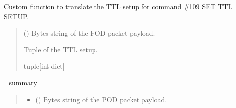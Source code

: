 \documentclass[letterpaper,10pt,english]{sphinxmanual}
\begin{document}
\begin{fulllineitems}
\begin{fulllineitems}
\label{\detokenize{Morelia.Devices:Morelia.Devices.PodDevice_8480SC.Pod8480SC._Custom109SETTTLSETUP}}
\pysigstartsignatures
{}
\pysigstopsignatures
\sphinxAtStartPar
Custom function to translate the TTL setup for command \#109 SET TTL SETUP.
\begin{quote}\begin{description}
\sphinxAtStartPar
{} () \textendash{} Bytes string of the POD packet payload.

\sphinxAtStartPar
Tuple of the TTL setup.

\sphinxAtStartPar
tuple{[}int|dict{]}

\end{description}\end{quote}

\end{fulllineitems}


\begin{fulllineitems}
\label{\detokenize{Morelia.Devices:Morelia.Devices.PodDevice_8480SC.Pod8480SC._CustomSTIMULUS}}
\pysigstartsignatures
{}
\pysigstopsignatures
\sphinxAtStartPar
\_summary\_
\begin{quote}\begin{description}
\begin{itemize}
\item {} 
\sphinxAtStartPar
{} () \textendash{} Bytes string of the POD packet payload.


\end{itemize}
\end{description}
\end{quote}
\end{fulllineitems}
\end{fulllineitems}
\end{document}
